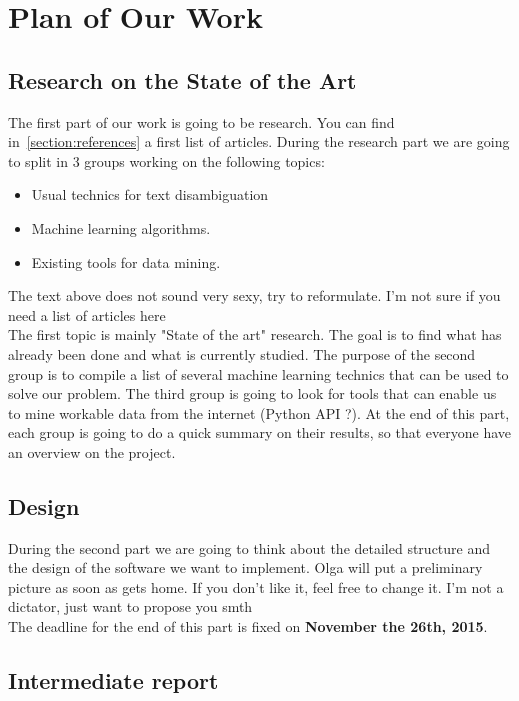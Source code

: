 \documentclass[11pt,a4paper]{article}
\newcommand{\red}[1]{{\color{red} #1}}
\begin{document}
\section{Plan of Our Work}
\subsection{Research on the State of the Art}

The first part of our work is going to be research. You can find in~\autoref{section:references} a first list of articles.
During the research part we are going to split in 3 groups working on the following topics:
\begin{itemize}
	\item Usual technics for text disambiguation
	\item Machine learning algorithms.
	\item Existing tools for data mining.
\end{itemize}
\red{The text above does not sound very sexy, try to reformulate. I'm not sure if you need a list of articles here\\}
The first topic is mainly "State of the art" research. The goal is to find what has already been done and what is currently studied. The purpose of the second group is to compile a list of several machine learning technics that can be used to solve our problem. The third group is going to look for tools that can enable us to mine workable data from the internet (Python API ?).
At the end of this part, each group is going to do a quick summary on their results, so that everyone have an overview on the project.

\subsection{Design}

During the second part we are going to think about the detailed structure and the design of the software we want to implement. 
\red{Olga will put a preliminary picture as soon as gets home. If you don't like it, feel free to change it. I'm not a dictator, just want to propose you smth}\\
The deadline for the end of this part is fixed on \textbf{November the 26th, 2015}.

\subsection{Intermediate report}
\end{document}
